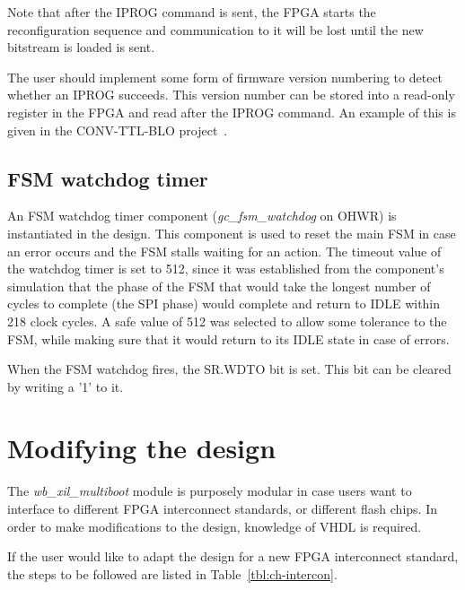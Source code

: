 \documentclass[a4paper,11pt]{article}
\newcounter{rownr}
\begin{document}
Note that after the IPROG command is sent, the FPGA starts the reconfiguration
sequence and communication to it will be lost until the new bitstream is loaded
is sent.

The user should implement some form of firmware version numbering to detect whether
an IPROG succeeds. This version number can be stored into a read-only register in the
FPGA and read after the IPROG command. An example of this is given in the CONV-TTL-BLO
project~\cite{ctb-proj}.

\subsection{FSM watchdog timer}

An FSM watchdog timer component (\textit{gc\_fsm\_watchdog} on OHWR) is instantiated
in the design. This component is used to reset the main FSM in case an error
occurs and the FSM stalls waiting for an action. The timeout value of the
watchdog timer is set to 512, since it was established from the component's
simulation that the phase of the FSM that would take the longest number of
cycles to complete (the SPI phase) would complete and return to IDLE
within 218 clock cycles. A safe value of 512 was selected to allow some tolerance
to the FSM, while making sure that it would return to its IDLE state in
case of errors.

When the FSM watchdog fires, the SR.WDTO bit is set. This bit can be cleared by
writing a '1' to it.

\section{Modifying the design}
\label{sec:modify}

The \textit{wb\_xil\_multiboot} module is purposely modular in case users want to
interface to different FPGA interconnect standards, or different flash chips.
In order to make modifications to the design, knowledge of VHDL is required.

If the user would like to adapt the design for a new FPGA interconnect standard,
the steps to be followed are listed in Table~\ref{tbl:ch-intercon}.

\setcounter{rownr}{0}
\end{document}

